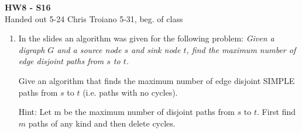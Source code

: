 \documentclass[11pt]{article}
\begin{document}
\begin{center}
{\bf\large HW8 - S16}\\
Handed out 5-24 \hfill Chris Troiano \hfill 5-31, beg.
of class \\
\end{center}

\begin{enumerate}
\item In the slides an algorithm was given for the following problem:
{\em Given a digraph $G$ and a source node $s$ and sink node $t$,
find the maximum number of edge disjoint paths from $s$ to $t$.}

Give an algorithm that finds the maximum number of
edge disjoint SIMPLE paths from $s$ to $t$
(i.e. paths with no cycles).

Hint: Let m be the maximum number of disjoint paths from $s$ to $t$.
First find $m$ paths of any kind and then delete cycles.


\end{enumerate}
\end{document}
